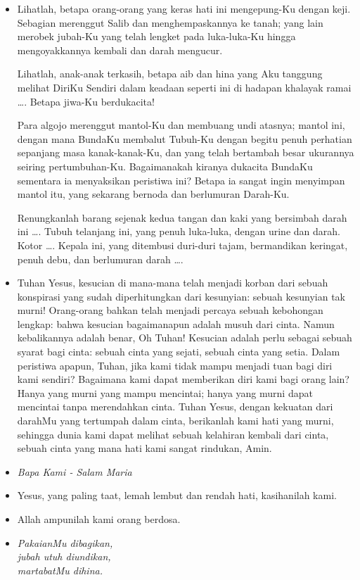 \documentclass[a5paper,headsepline,titlepage,10pt,nnormalheadings,DIVcalc]{scrbook}
\newcommand{\BU}[1]{\begin{itemize} \item[U:] #1 \end{itemize}}
\newcommand{\BP}[1]{\begin{itemize} \item[P:] #1 \end{itemize}}
\newcommand{\kasihanilahKami}{\BP{Yesus, yang paling taat, lemah lembut dan rendah hati, kasihanilah kami.}
\BU{Allah ampunilah kami orang berdosa.}}
\begin{document}
\BP{Lihatlah, betapa orang-orang yang keras hati ini mengepung-Ku dengan keji. Sebagian merenggut Salib dan menghempaskannya ke tanah; yang lain merobek jubah-Ku yang telah lengket pada luka-luka-Ku hingga mengoyakkannya kembali dan darah mengucur.

Lihatlah, anak-anak terkasih, betapa aib dan hina yang Aku tanggung melihat DiriKu Sendiri dalam keadaan seperti ini di hadapan khalayak ramai \dots . Betapa jiwa-Ku berdukacita!

Para algojo merenggut mantol-Ku dan membuang undi atasnya; mantol ini, dengan mana BundaKu membalut Tubuh-Ku dengan begitu penuh perhatian sepanjang masa kanak-kanak-Ku, dan yang telah bertambah besar ukurannya seiring pertumbuhan-Ku. Bagaimanakah kiranya dukacita BundaKu sementara ia menyaksikan peristiwa ini? Betapa ia sangat ingin menyimpan mantol itu, yang sekarang bernoda dan berlumuran Darah-Ku.

Renungkanlah barang sejenak kedua tangan dan kaki yang bersimbah darah ini \dots . Tubuh telanjang ini, yang penuh luka-luka, dengan urine dan darah. Kotor \dots . Kepala ini, yang ditembusi duri-duri tajam, bermandikan keringat, penuh debu, dan berlumuran darah \dots .}

\BU{Tuhan Yesus, kesucian di mana-mana telah menjadi korban dari sebuah konspirasi yang sudah diperhitungkan dari kesunyian: sebuah kesunyian tak murni! Orang-orang bahkan telah menjadi percaya sebuah kebohongan lengkap: bahwa kesucian bagaimanapun adalah musuh dari cinta. Namun kebalikannya adalah benar, Oh Tuhan! Kesucian adalah perlu sebagai sebuah syarat bagi cinta: sebuah cinta yang sejati, sebuah cinta yang setia. Dalam peristiwa apapun, Tuhan, jika kami tidak mampu menjadi tuan bagi diri kami sendiri? Bagaimana kami dapat memberikan diri kami bagi orang lain? Hanya yang murni yang mampu mencintai; hanya yang murni dapat mencintai tanpa merendahkan cinta. Tuhan Yesus, dengan kekuatan dari darahMu yang tertumpah dalam cinta, berikanlah kami hati yang murni, sehingga dunia kami dapat melihat sebuah kelahiran kembali dari cinta, sebuah cinta yang mana hati kami sangat rindukan, Amin.}

\large\begin{itemize}\item[~]\it{Bapa Kami - Salam Maria}\end{itemize}\normalsize
\kasihanilahKami

\begin{itemize}
\item[11.] \it{PakaianMu dibagikan,\\
	jubah utuh diundikan,\\
	martabatMu dihina.}
\end{itemize}
\end{document}

